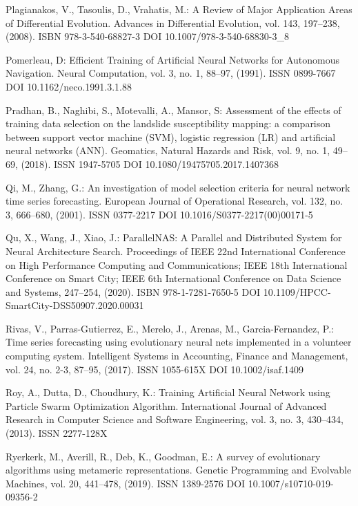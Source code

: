 \begin{thebibliography}{99.}
 Plagianakos, V., Tasoulis, D., Vrahatis, M.: A Review of Major Application Areas of Differential Evolution. Advances in Differential Evolution, vol. 143, 197--238, (2008). ISBN 978-3-540-68827-3 DOI 10.1007/978-3-540-68830-3\_8

 Pomerleau, D: Efficient Training of Artificial Neural Networks for Autonomous Navigation. Neural Computation, vol. 3, no. 1, 88--97, (1991). ISSN 0899-7667 DOI 10.1162/neco.1991.3.1.88

 Pradhan, B., Naghibi, S., Motevalli, A., Mansor, S: Assessment of the effects of training data selection on the landslide susceptibility mapping: a comparison between support vector machine (SVM), logistic regression (LR) and artificial neural networks (ANN). Geomatics, Natural Hazards and Risk, vol. 9, no. 1, 49--69, (2018). ISSN 1947-5705 DOI 10.1080/19475705.2017.1407368

 Qi, M., Zhang, G.: An investigation of model selection criteria for neural network time series forecasting. European Journal of Operational Research, vol. 132, no. 3, 666--680, (2001). ISSN 0377-2217 DOI 10.1016/S0377-2217(00)00171-5

 Qu, X., Wang, J., Xiao, J.: ParallelNAS: A Parallel and Distributed System for Neural Architecture Search. Proceedings of IEEE 22nd International Conference on High Performance Computing and Communications; IEEE 18th International Conference on Smart City; IEEE 6th International Conference on Data Science and Systems, 247--254, (2020). ISBN 978-1-7281-7650-5 DOI 10.1109/HPCC-SmartCity-DSS50907.2020.00031

 Rivas, V., Parras-Gutierrez, E., Merelo, J., Arenas, M., Garcia-Fernandez, P.: Time series forecasting using evolutionary neural nets implemented in a volunteer computing system. Intelligent Systems in Accounting, Finance and Management, vol. 24, no. 2-3, 87--95, (2017). ISSN 1055-615X DOI 10.1002/isaf.1409

 Roy, A., Dutta, D., Choudhury, K.: Training Artificial Neural Network using Particle Swarm Optimization Algorithm. International Journal of Advanced Research in Computer Science and Software Engineering, vol. 3, no. 3, 430--434, (2013). ISSN 2277-128X

 Ryerkerk, M., Averill, R., Deb, K., Goodman, Е.: A survey of evolutionary algorithms using metameric representations. Genetic Programming and Evolvable Machines, vol. 20, 441--478, (2019). ISSN 1389-2576 DOI 10.1007/s10710-019-09356-2


\end{thebibliography}
